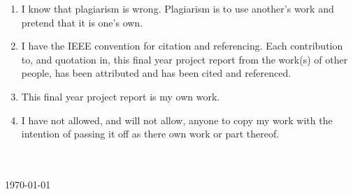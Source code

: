 {}

    \begin{enumerate}
        \item I know that plagiarism is wrong. Plagiarism is to use another's work and pretend that it is one's own.
        \item I have the IEEE convention for citation and referencing. Each contribution to, and quotation in, this final year project report from the work(s) of other people, has been attributed and has been cited and referenced.
        \item This final year project report is my own work.
        \item I have not allowed, and will not allow, anyone to copy my work with the intention of passing it off as there own work or part thereof.
    \end{enumerate}

    \vspace{15mm}

    \mbox{}\hfill\begin{minipage}{65mm} %
      \dotfill\\[1ex]%
      \Author\\
      \today
    \end{minipage}
    
    \vfill\vfill\vfill

